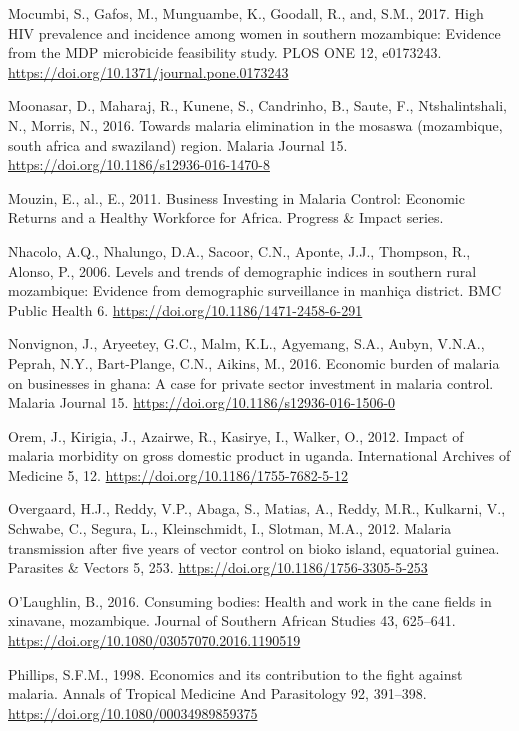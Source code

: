 \documentclass[]{article}
\begin{document}
\hypertarget{ref-Mocumbi2017}{}
Mocumbi, S., Gafos, M., Munguambe, K., Goodall, R., and, S.M., 2017.
High HIV prevalence and incidence among women in southern mozambique:
Evidence from the MDP microbicide feasibility study. PLOS ONE 12,
e0173243. \url{https://doi.org/10.1371/journal.pone.0173243}

\hypertarget{ref-Moonasar_2016}{}
Moonasar, D., Maharaj, R., Kunene, S., Candrinho, B., Saute, F.,
Ntshalintshali, N., Morris, N., 2016. Towards malaria elimination in the
mosaswa (mozambique, south africa and swaziland) region. Malaria Journal
15. \url{https://doi.org/10.1186/s12936-016-1470-8}

\hypertarget{ref-Mouzin2011}{}
Mouzin, E., al., E., 2011. Business Investing in Malaria Control:
Economic Returns and a Healthy Workforce for Africa. Progress \& Impact
series.

\hypertarget{ref-Nhacolo_2006}{}
Nhacolo, A.Q., Nhalungo, D.A., Sacoor, C.N., Aponte, J.J., Thompson, R.,
Alonso, P., 2006. Levels and trends of demographic indices in southern
rural mozambique: Evidence from demographic surveillance in manhiça
district. BMC Public Health 6.
\url{https://doi.org/10.1186/1471-2458-6-291}

\hypertarget{ref-Nonvignon_2016}{}
Nonvignon, J., Aryeetey, G.C., Malm, K.L., Agyemang, S.A., Aubyn,
V.N.A., Peprah, N.Y., Bart-Plange, C.N., Aikins, M., 2016. Economic
burden of malaria on businesses in ghana: A case for private sector
investment in malaria control. Malaria Journal 15.
\url{https://doi.org/10.1186/s12936-016-1506-0}

\hypertarget{ref-Orem_2012}{}
Orem, J., Kirigia, J., Azairwe, R., Kasirye, I., Walker, O., 2012.
Impact of malaria morbidity on gross domestic product in uganda.
International Archives of Medicine 5, 12.
\url{https://doi.org/10.1186/1755-7682-5-12}

\hypertarget{ref-Overgaard2012}{}
Overgaard, H.J., Reddy, V.P., Abaga, S., Matias, A., Reddy, M.R.,
Kulkarni, V., Schwabe, C., Segura, L., Kleinschmidt, I., Slotman, M.A.,
2012. Malaria transmission after five years of vector control on bioko
island, equatorial guinea. Parasites \& Vectors 5, 253.
\url{https://doi.org/10.1186/1756-3305-5-253}

\hypertarget{ref-OLaughlin2016}{}
O'Laughlin, B., 2016. Consuming bodies: Health and work in the cane
fields in xinavane, mozambique. Journal of Southern African Studies 43,
625--641. \url{https://doi.org/10.1080/03057070.2016.1190519}

\hypertarget{ref-Phillips98}{}
Phillips, S.F.M., 1998. Economics and its contribution to the fight
against malaria. Annals of Tropical Medicine And Parasitology 92,
391--398. \url{https://doi.org/10.1080/00034989859375}
\end{document}
